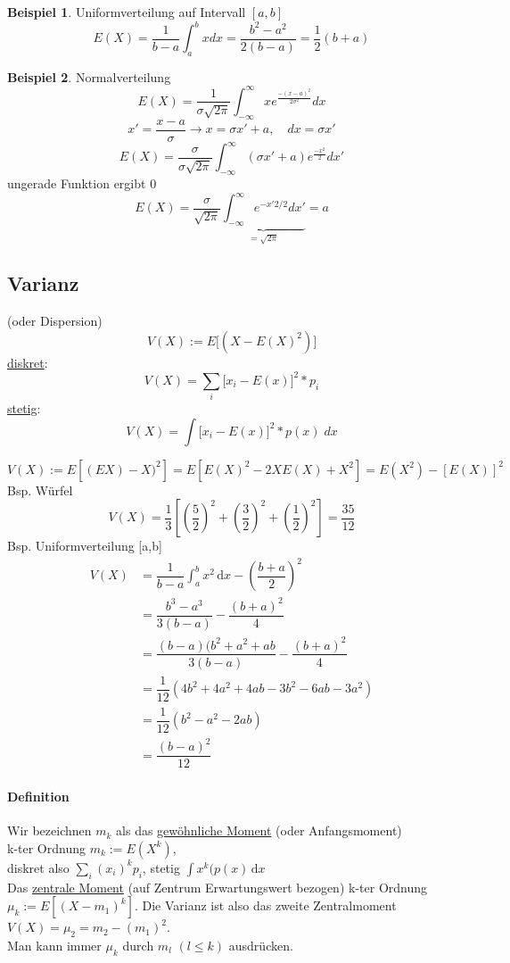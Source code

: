 \documentclass[10pt]{report}
\theoremstyle{definition}
\newtheorem{exmp}{Beispiel}
\begin{document}
\begin{exmp}
	Uniformverteilung auf Intervall $[a,b]$
	\[ E(X)= \frac{1}{b-a} \int_{a}^b x dx =  \frac{b^2 - a^2}{2(b-a)} = \frac{1}{2}(b+a) \]
\end{exmp}


\begin{exmp}
	Normalverteilung
\[ E(X)= \frac{1}{\sigma \sqrt{2 \pi}} \int_{-\infty}^{\infty} x e^{\frac{-(x-a)^2}{2\sigma^2}} dx \]
\[ x' = \frac{x-a}{\sigma} \rightarrow x = \sigma x' + a ,\quad dx= \sigma x' \]
\[ E(X) = \frac{\sigma}{\sigma \sqrt{2 \pi}} \int_{- \infty}^{\infty} (\sigma x' + a) e^{\frac{-x^2}{2}} dx' \]
ungerade Funktion ergibt 0
\[ E(X) = \frac{\sigma}{\sqrt{2 \pi}} \underbrace{\int_{- \infty}^{\infty} e^{-x' 2/2} dx'}_{=\sqrt{2 \pi}} = a \]
\end{exmp}

\subsection{Varianz} (oder Dispersion)
\[ V(X) := E \big[ (X-E(X)^2) \big] \]
\underline{diskret}: 
\[ V(X) = \sum\limits_{i} \big[ x_i - E(x) \big] ^2 * p_i \]
\underline{stetig}: 
\[ V(X) = \int \big[ x_i - E(x) \big] ^2 * p(x)\; dx \]


\[
V(X) := E[(EX)-X)^2] = E[E(X)^2 - 2X E(X) + X^2]  = E(X^2) - [E(X)]^2
\]
Bsp. Würfel
\[
V(X) = \dfrac{1}{3} \left[\left(\dfrac{5}{2}\right)^2 + \left(\dfrac{3}{2}\right)^2 + \left(\dfrac{1}{2}\right)^2\right] = \dfrac{35}{12}
\]
Bsp. Uniformverteilung [a,b]
\begin{align*}
V(X) &= \dfrac{1}{b-a} \int_a^b \! x^2 \, \mathrm{d}x - \left(\dfrac{b+a}{2}\right)^2\\
&= \dfrac{b^3 - a^3}{3 (b-a)} - \dfrac{(b+a)^2}{4} \\
&= \dfrac{(b-a) (b^2+a^2+ab}{3(b-a)} - \dfrac{(b+a)^2}{4}\\
&= \dfrac{1}{12} (4b^2+4a^2+4ab-3b^2-6 ab-3a^2)\\
&= \dfrac{1}{12} (b^2-a^2-2ab) \\
&= \dfrac{(b-a)^2}{12}
\end{align*}
\paragraph{Definition}
Wir bezeichnen $m_k$ als das \underline{gewöhnliche Moment} (oder Anfangsmoment)\\
k-ter Ordnung $m_k := E(X^k)$, \\
diskret also $\sum_i\left(x_i\right)^k p_i$,
stetig $\int \! x^k (p(x) \, \mathrm{d}x$
\\
Das \underline{zentrale Moment} (auf Zentrum Erwartungswert bezogen) k-ter Ordnung \\
$\mu_k := E\left[(X-m_1)^k\right]$. Die Varianz ist also das zweite Zentralmoment $V(X) = \mu_2 = m_2 - (m_1)^2$.\\
Man kann immer $\mu_k$ durch $m_l$ $\left( l \leq k\right)$ ausdrücken.
\end{document}

